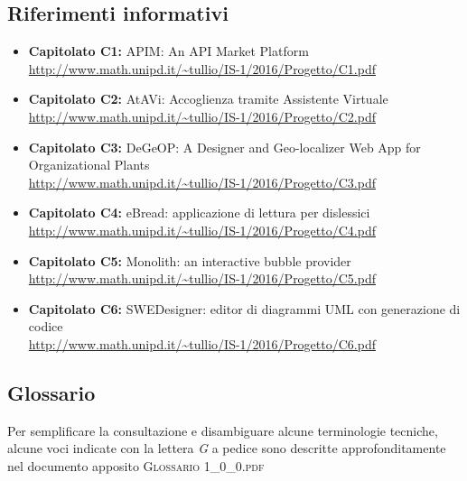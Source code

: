 \subsection{Riferimenti informativi}
\begin{itemize}
	\item \textbf{Capitolato C1:} APIM: An API Market Platform \\ \url{http://www.math.unipd.it/~tullio/IS-1/2016/Progetto/C1.pdf}
	\item \textbf{Capitolato C2:} AtAVi: Accoglienza tramite Assistente Virtuale \\ \url{http://www.math.unipd.it/~tullio/IS-1/2016/Progetto/C2.pdf}
	\item \textbf{Capitolato C3:} DeGeOP: A Designer and Geo-localizer Web App for Organizational Plants \\
	\url{http://www.math.unipd.it/~tullio/IS-1/2016/Progetto/C3.pdf}
	\item \textbf{Capitolato C4:} eBread: applicazione di lettura per dislessici \\
	\url{http://www.math.unipd.it/~tullio/IS-1/2016/Progetto/C4.pdf}
	\item \textbf{Capitolato C5:} Monolith: an interactive bubble provider \\
	\url{http://www.math.unipd.it/~tullio/IS-1/2016/Progetto/C5.pdf}
	\item \textbf{Capitolato C6:} SWEDesigner: editor di diagrammi UML con generazione di codice \\
	\url{http://www.math.unipd.it/~tullio/IS-1/2016/Progetto/C6.pdf}
\end{itemize}

\subsection{Glossario}
Per semplificare la consultazione e disambiguare alcune terminologie tecniche, alcune voci indicate con la lettera \textit{G} a pedice sono descritte approfonditamente nel documento apposito \textsc{Glossario 1\_0\_0.pdf}